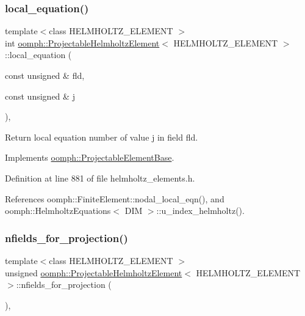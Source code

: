 \subsubsection{\texorpdfstring{local\+\_\+equation()}{local\_equation()}}
{\footnotesize\ttfamily template$<$class H\+E\+L\+M\+H\+O\+L\+T\+Z\+\_\+\+E\+L\+E\+M\+E\+NT $>$ \\
int \hyperlink{classoomph_1_1ProjectableHelmholtzElement}{oomph\+::\+Projectable\+Helmholtz\+Element}$<$ H\+E\+L\+M\+H\+O\+L\+T\+Z\+\_\+\+E\+L\+E\+M\+E\+NT $>$\+::local\+\_\+equation (\begin{DoxyParamCaption}\item[{const unsigned \&}]{fld,  }\item[{const unsigned \&}]{j }\end{DoxyParamCaption})\hspace{0.3cm}{\ttfamily [inline]}, {\ttfamily [virtual]}}



Return local equation number of value j in field fld. 



Implements \hyperlink{classoomph_1_1ProjectableElementBase_ac5c27ae929ff636dc7747fe23fd4f738}{oomph\+::\+Projectable\+Element\+Base}.



Definition at line 881 of file helmholtz\+\_\+elements.\+h.



References oomph\+::\+Finite\+Element\+::nodal\+\_\+local\+\_\+eqn(), and oomph\+::\+Helmholtz\+Equations$<$ D\+I\+M $>$\+::u\+\_\+index\+\_\+helmholtz().

\mbox{\label{classoomph_1_1ProjectableHelmholtzElement_a8a516cbf286391aa6e3c0651db47de6f}} 
\subsubsection{\texorpdfstring{nfields\+\_\+for\+\_\+projection()}{nfields\_for\_projection()}}
{\footnotesize\ttfamily template$<$class H\+E\+L\+M\+H\+O\+L\+T\+Z\+\_\+\+E\+L\+E\+M\+E\+NT $>$ \\
unsigned \hyperlink{classoomph_1_1ProjectableHelmholtzElement}{oomph\+::\+Projectable\+Helmholtz\+Element}$<$ H\+E\+L\+M\+H\+O\+L\+T\+Z\+\_\+\+E\+L\+E\+M\+E\+NT $>$\+::nfields\+\_\+for\+\_\+projection (\begin{DoxyParamCaption}{ }\end{DoxyParamCaption})\hspace{0.3cm}{\ttfamily [inline]}, {\ttfamily [virtual]}}



